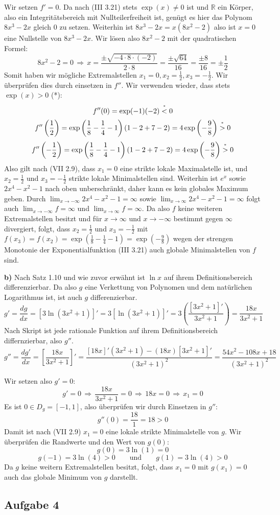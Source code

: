 \documentclass[a4paper,graphics,11pt]{article}
\newcommand{\aufgabe}[1]{\subsection*{Aufgabe #1}}
\newcommand{\up}[2]{\mathrel{\overset{\makebox[0pt]{\mbox{\normalfont\tiny #2}}}{#1}}}
\begin{document}
Wir setzen $f'=0$. Da nach (III 3.21) stets $\exp(x) \neq 0$ ist und $\mathbb{R}$ ein Körper,
also ein Integritätsbereich mit Nullteilerfreiheit ist, genügt es hier das Polynom
$8x^3-2x$ gleich 0 zu setzen. Weiterhin ist $8x^3-2x = x(8x^2-2)$ also ist $x=0$ eine
Nullstelle von $8x^3-2x$. Wir lösen also $8x^2-2$ mit der quadratischen Formel:
$$
    8x^2-2 = 0
    \,\Longrightarrow\, x = \frac{\pm\sqrt{-4\cdot8\cdot(-2)}}{2\cdot 8}
    = \frac{\pm \sqrt{64}}{16} = \frac{\pm8}{16} = \pm \frac{1}{2}
$$
Somit haben wir mögliche Extremalstellen $x_1 = 0, x_2 = \frac{1}{2}, x_3 = - \frac{1}{2}$.
Wir überprüfen dies durch einsetzen in $f''$. Wir verwenden wieder, dass stets $\exp(x) > 0$ (*):
$$
    f''(0) = \exp(-1)(-2) \up{<}{*} 0
$$$$
    f''\left(\frac{1}{2}\right)
    = \exp\left(\frac{1}{8}- \frac{1}{4} -1\right)\left(1- 2 + 7 - 2\right)
    = 4\exp\left(-\frac{9}{8}\right) \up{>}{*} 0
$$$$
     f''\left(-\frac{1}{2}\right)
    = \exp\left(\frac{1}{8}- \frac{1}{4} -1\right)\left(1- 2 + 7 - 2\right)
    = 4\exp\left(-\frac{9}{8}\right) \up{>}{*} 0
$$
Also gilt nach (VII 2.9), dass $x_1 = 0$ eine strikte lokale Maximalstelle ist,
und $x_2=\frac{1}{2}$ und $x_3 = - \frac{1}{2}$ strikte lokale Minimalstellen sind.
Weiterhin ist $e^x$ sowie $2x^4-x^2-1$ nach oben unberschränkt, daher kann es kein
globales Maximum geben. Durch $\lim_{x \to -\infty}\limits 2x^4-x^2-1 = \infty$ sowie
$\lim_{x \to \infty}\limits 2x^4-x^2-1 = \infty$ folgt auch $\lim_{x \to -\infty}\limits
f = \infty$ und $\lim_{x \to \infty}\limits f = \infty$. Da also $f$ keine weiteren
Extremalstellen besitzt und für $x\to \infty$ und $x\to -\infty$ bestimmt gegen $\infty$ 
divergiert, folgt, dass $x_2 = \frac{1}{2}$ und $x_3 = -\frac{1}{2}$
mit $f(x_3) = f(x_2) = \exp\left(\frac{1}{8}-\frac{1}{4} -1\right)
= \exp\left(-\frac{9}{8}\right)$ wegen der strengen Monotonie der Exponentialfunktion
(III 3.21) auch globale Minimalstellen von $f$ sind.

\newpage

\textbf{b)}
Nach Satz 1.10 und wie zuvor erwähnt ist $\ln x$ auf ihrem Definitionsbereich differenzierbar. Da also $g$ eine
Verkettung von Polynomen und dem natürlichen Logarithmus ist, ist auch $g$ differenzierbar.
$$
    g' = \frac{dg}{dx} = [3\ln(3x^2+1)]'
    = 3[\ln(3x^2+1)]'
    = 3\left(\frac{[3x^2+1]'}{3x^2+1}\right)
    = \frac{18x}{3x^2+1}
$$
Nach Skript ist jede rationale Funktion auf ihrem Definitionsbereich differnzierbar, also $g''$.
$$
    g'' = \frac{dg'}{dx} = \left[\frac{18x}{3x^2+1}\right]'
    = \frac{[18x]'(3x^2+1)-(18x)[3x^2+1]'}{(3x^2+1)^2}
    = \frac{54x^2-108x+18}{(3x^2+1)^2}
$$

Wir setzen also $g' = 0$:
$$
    g' = 0 \,\Longrightarrow\, \frac{18x}{3x^2+1} = 0
    \,\Longrightarrow\, 18x = 0 \,\Longrightarrow\, x_1 = 0
$$
Es ist $0 \in D_g = [-1, 1]$, also überprüfen wir durch Einsetzen in $g''$:
$$
    g''(0) = \frac{18}{1} = 18 > 0
$$
Damit ist nach (VII 2.9) $x_1=0$ eine lokale strikte Minimalstelle von $g$.
Wir überprüfen die Randwerte und den Wert von $g(0)$:
$$
    g(0) = 3\ln(1) = 0
$$$$
    g(-1) = 3\ln(4) > 0 \qquad\text{und}\qquad g(1) = 3\ln(4) >0
$$
Da $g$ keine weitern Extremalstellen besitzt, folgt, dass $x_1=0$ mit $g(x_1) = 0$ auch das
globale Minimum von $g$ darstellt.

\aufgabe{4}
\end{document}
